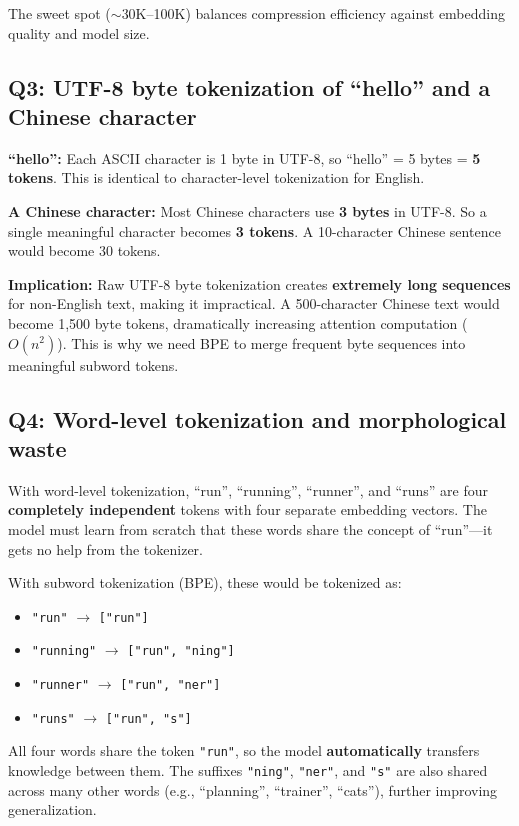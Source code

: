 \documentclass[11pt,a4paper]{article}
\begin{document}
The sweet spot ($\sim$30K--100K) balances compression efficiency against embedding quality and model size.

\subsection*{Q3: UTF-8 byte tokenization of ``hello'' and a Chinese character}

\textbf{``hello'':} Each ASCII character is 1 byte in UTF-8, so ``hello'' = 5 bytes = \textbf{5 tokens}. This is identical to character-level tokenization for English.

\textbf{A Chinese character:} Most Chinese characters use \textbf{3 bytes} in UTF-8. So a single meaningful character becomes \textbf{3 tokens}. A 10-character Chinese sentence would become 30 tokens.

\textbf{Implication:} Raw UTF-8 byte tokenization creates \textbf{extremely long sequences} for non-English text, making it impractical. A 500-character Chinese text would become 1,500 byte tokens, dramatically increasing attention computation ($O(n^2)$). This is why we need BPE to merge frequent byte sequences into meaningful subword tokens.

\subsection*{Q4: Word-level tokenization and morphological waste}

With word-level tokenization, ``run'', ``running'', ``runner'', and ``runs'' are four \textbf{completely independent} tokens with four separate embedding vectors. The model must learn from scratch that these words share the concept of ``run''---it gets no help from the tokenizer.

With subword tokenization (BPE), these would be tokenized as:
\begin{itemize}[leftmargin=1.5em]
    \item \texttt{"run"} $\to$ \texttt{["run"]}
    \item \texttt{"running"} $\to$ \texttt{["run", "ning"]}
    \item \texttt{"runner"} $\to$ \texttt{["run", "ner"]}
    \item \texttt{"runs"} $\to$ \texttt{["run", "s"]}
\end{itemize}

All four words share the token \texttt{"run"}, so the model \textbf{automatically} transfers knowledge between them. The suffixes \texttt{"ning"}, \texttt{"ner"}, and \texttt{"s"} are also shared across many other words (e.g., ``planning'', ``trainer'', ``cats''), further improving generalization.
\end{document}
